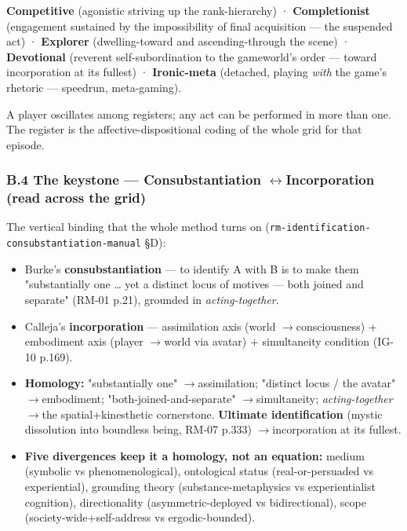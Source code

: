 \documentclass[11pt]{report}
\begin{document}
\textbf{Competitive} (agonistic striving up the rank-hierarchy) · \textbf{Completionist} (engagement sustained by the impossibility of final acquisition — the suspended act) · \textbf{Explorer} (dwelling-toward and ascending-through the scene) · \textbf{Devotional} (reverent self-subordination to the gameworld's order — toward incorporation at its fullest) · \textbf{Ironic-meta} (detached, playing \textit{with} the game's rhetoric — speedrun, meta-gaming).


A player oscillates among registers; any act can be performed in more than one. The register is the affective-dispositional coding of the whole grid for that episode.


\subsubsection{B.4 The keystone — Consubstantiation $\leftrightarrow$\allowbreak  Incorporation (read across the grid)}


The vertical binding that the whole method turns on (\texttt{rm-\discretionary{}{}{}identification-\discretionary{}{}{}consubstantiation-\discretionary{}{}{}manual} §D):


\begin{itemize}
\item Burke's \textbf{consubstantiation} — to identify A with B is to make them "substantially one … yet a distinct locus of motives — both joined and separate" (RM-01 p.21), grounded in \textit{acting-together}.
\item Calleja's \textbf{incorporation} — assimilation axis (world $\rightarrow$\allowbreak  consciousness) + embodiment axis (player $\rightarrow$\allowbreak  world via avatar) + simultaneity condition (IG-10 p.169).
\item \textbf{Homology:} "substantially one" $\rightarrow$\allowbreak  assimilation; "distinct locus / the avatar" $\rightarrow$\allowbreak  embodiment; "both-joined-and-separate" $\rightarrow$\allowbreak  simultaneity; \textit{acting-together} $\rightarrow$\allowbreak  the spatial+kinesthetic cornerstone. \textbf{Ultimate identification} (mystic dissolution into boundless being, RM-07 p.333) $\rightarrow$\allowbreak  incorporation at its fullest.
\item \textbf{Five divergences keep it a homology, not an equation:} medium (symbolic vs phenomenological), ontological status (real-or-persuaded vs experiential), grounding theory (substance-metaphysics vs experientialist cognition), directionality (asymmetric-deployed vs bidirectional), scope (society-wide+self-address vs ergodic-bounded).
\end{itemize}
\end{document}
